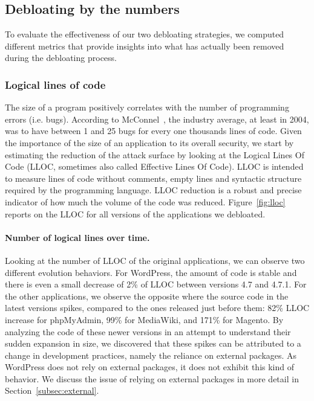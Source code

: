 \subsection{Debloating by the numbers}
To evaluate the effectiveness of our two debloating strategies, we computed different metrics that provide
insights into what has actually been removed during the debloating process.


\subsubsection{Logical lines of code}
\label{subsubsec:lloc}
The size of a program positively correlates with the number of programming errors (i.e. bugs). According to McConnel~\cite{mcconnell2004code}, the industry average, at least in 2004, was to have between 1 and 25 bugs for every one thousands lines of code. Given the importance of the size of an application to its overall security, we start by estimating the reduction of the attack surface by looking at the
Logical Lines Of Code (LLOC, sometimes also called Effective Lines Of
Code). LLOC is intended to measure lines of code without comments, empty
lines and syntactic structure required by the programming language. LLOC
reduction is a robust and precise indicator of how much the volume of
the code was reduced.
Figure~\ref{fig:lloc} reports on the LLOC for all versions of the applications
we debloated.

\paragraph{Number of logical lines over time.}
Looking at the number of LLOC of the original applications, we can observe two different evolution behaviors.
For WordPress, the amount of code is stable and there is even a small decrease of 2\% of LLOC between versions 4.7 and 4.7.1.
For the other applications, we observe the opposite where the source code in the latest versions spikes, compared to the ones released just before them: 82\% LLOC increase for phpMyAdmin, 99\% for MediaWiki, and 171\% for Magento. By
analyzing the code of these newer versions in an attempt to understand their
sudden expansion in size, we discovered that these spikes can be attributed to
a change in development practices, namely the reliance on external packages.
As WordPress does not rely on external packages, it does not exhibit this kind of behavior. We
discuss the issue of relying on external packages in more detail in Section~\ref{subsec:external}.


